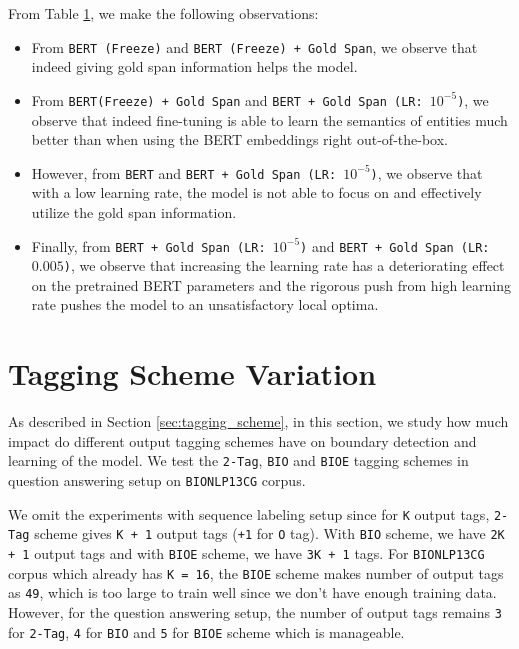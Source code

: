 From Table \ref{}, we make the following observations:

\begin{itemize}
    \item From \texttt{BERT (Freeze)} and \texttt{BERT (Freeze) + Gold Span}, we observe that indeed giving gold span information helps the model.
    
    \item From \texttt{BERT(Freeze) + Gold Span} and \texttt{BERT + Gold Span (LR: $10^{-5}$)}, we observe that indeed fine-tuning is able to learn the semantics of entities much better than when using the BERT embeddings right out-of-the-box.
    
    \item However, from \texttt{BERT} and \texttt{BERT + Gold Span (LR: $10^{-5}$)}, we observe that with a low learning rate, the model is not able to focus on and effectively utilize the gold span information.
    
    \item Finally, from \texttt{BERT + Gold Span (LR: $10^{-5}$)} and \texttt{BERT + Gold Span (LR: $0.005$)}, we observe that increasing the learning rate has a deteriorating effect on the pretrained BERT parameters and the rigorous push from high learning rate pushes the model to an unsatisfactory local optima.
\end{itemize}

\section{Tagging Scheme Variation}
As described in Section \ref{sec:tagging_scheme}, in this section, we study how much impact do different output tagging schemes have on boundary detection and learning of the model. We test the \texttt{2-Tag}, \texttt{BIO} and \texttt{BIOE} tagging schemes in question answering setup on \texttt{BIONLP13CG} corpus.

We omit the experiments with sequence labeling setup since for \texttt{K} output tags, \texttt{2-Tag} scheme gives \texttt{K + 1} output tags (\texttt{+1} for \texttt{O} tag). With \texttt{BIO} scheme, we have \texttt{2K + 1} output tags and with \texttt{BIOE} scheme, we have \texttt{3K + 1} tags. For \texttt{BIONLP13CG} corpus which already has \texttt{K = 16}, the \texttt{BIOE} scheme makes number of output tags as \texttt{49}, which is too large to train well since we don't have enough training data. However, for the question answering setup, the number of output tags remains \texttt{3} for \texttt{2-Tag}, \texttt{4} for \texttt{BIO} and \texttt{5} for \texttt{BIOE} scheme which is manageable.

